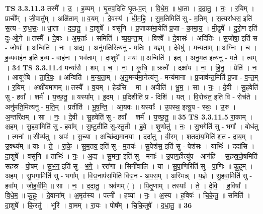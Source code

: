 \documentclass[17pt]{extarticle}
\begin{document}
                  \newline
                                \textbf{ TS 3.3.11.3} \newline
                  तस्मै᳚ । उ॒ । ह॒व्यम् । घृ॒तव॒दिति॑ घृ॒त-व॒त् । वि॒धे॒म॒ ॥ धा॒ता । द॒दा॒तु॒ । नः॒ । र॒यिम् । प्राची᳚म् । जी॒वातु᳚म् । अक्षि॑ताम् ॥ व॒यम् । दे॒वस्य॑ । धी॒म॒हि॒ । सु॒म॒तिमिति॑ सु - म॒तिम् । स॒त्यरा॑धस॒ इति॑ स॒त्य - रा॒ध॒सः॒ ॥ धा॒ता । द॒दा॒तु॒ । दा॒शुषे᳚ । वसू॑नि । प्र॒जाका॑मा॒येति॑ प्र॒जा - का॒मा॒य॒ । मी॒ढुषे᳚ । दु॒रो॒ण इति॑ दुः-ओ॒ने ॥ तस्मै᳚ । दे॒वाः । अ॒मृताः᳚ । समिति॑ । व्य॒य॒न्ता॒म् । विश्वे᳚ । दे॒वासः॑ । अदि॑तिः । स॒जोषा॒ इति॑ स - जोषाः᳚ ॥ अन्विति॑ । नः॒ । अ॒द्य । अनु॑मति॒रित्यनु॑ - म॒तिः॒ । य॒ज्ञ्म् । दे॒वेषु॑ । म॒न्य॒ता॒म् ॥ अ॒ग्निः । च॒ । ह॒व्य॒वाह॑न॒ इति॑ हव्य - वाह॑नः । भव॑ताम् । दा॒शुषे᳚ । मयः॑ ॥ अन्विति॑ । इत् । अ॒नु॒म॒त॒ इत्य॑नु - म॒ते॒ । त्वम् । \textbf{  34} \newline
                  \newline
                                \textbf{ TS 3.3.11.4} \newline
                  मन्या॑सै । शम् । च॒ । नः॒ । कृ॒धि॒ ॥ क्रत्वे᳚ । दक्षा॑य । नः॒ । हि॒नु॒ । प्रेति॑ । नः॒ । आयूꣳ॑षि । ता॒रि॒षः॒ ॥ अन्विति॑ । म॒न्य॒ता॒म् । अ॒नु॒मन्य॑मा॒नेत्य॑नु - मन्य॑माना । प्र॒जाव॑न्त॒मिति॑ प्र॒जा - व॒न्त॒म् । र॒यिम् । अक्षी॑यमाणम् ॥ तस्यै᳚ । व॒यम् । हेड॑सि । मा । अपीति॑ । भू॒म॒ । सा । नः॒ । दे॒वी । सु॒हवेति॑ सु - हवा᳚ । शर्म॑ । य॒च्छ॒तु॒ ॥ यस्या᳚म् । इ॒दम् । प्र॒दिशीति॑ प्र - दिशि॑ । यत् । वि॒रोच॑त॒ इति॑ वि - रोच॑ते । अनु॑मति॒मित्यनु॑ - म॒ति॒म् । प्रतीति॑ । भू॒ष॒न्ति॒ । आ॒यवः॑ ॥ यस्याः᳚ । उ॒पस्थ॒ इत्यु॒प - स्थः॒ । उ॒रु । अ॒न्तरि॑क्षम् । सा । नः॒ । दे॒वी । सु॒हवेति॑ सु - हवा᳚ । शर्म॑ । य॒च्छ॒तु॒ ॥ \textbf{  35} \newline
                  \newline
                                \textbf{ TS 3.3.11.5} \newline
                  रा॒काम् । अ॒हम् । सु॒हवा॒मिति॑ सु - हवा᳚म् । सु॒ष्टु॒तीति॑ सु-स्तु॒ती । हु॒वे॒ । शृ॒णोतु॑ । नः॒ । सु॒भगेति॑ सु - भगा᳚ । बोध॑तु । त्मना᳚ ॥ सीव्य॑तु । अपः॑ । सू॒च्या । अच्छि॑द्यमानया । ददा॑तु । वी॒रम् । श॒तदा॑य॒मिति॑ श॒त - दा॒य॒म् । उ॒क्थ्य᳚म् ॥ याः । ते॒ । रा॒के॒ । सु॒म॒तय॒ इति॑ सु - म॒तयः॑ । सु॒पेश॑स॒ इति॑ सु - पेश॑सः । याभिः॑ । ददा॑सि । दा॒शुषे᳚ । वसू॑नि ॥ ताभिः॑ । नः॒ । अ॒द्य । सु॒मना॒ इति॑ सु - मनाः᳚ । उ॒पाग॒हीत्यु॑प - आग॑हि । स॒ह॒स्र॒पो॒षमिति॑ सहस्र - पो॒षम् । सु॒भ॒ग॒ इति॑ सु - भ॒गे॒ । ररा॑णा ॥ सिनी॑वालि । या । सु॒पा॒णिरिति॑ सु - पा॒णिः ॥ कु॒हूम् । अ॒हम् । सु॒भगा॒मिति॑ सु - भगा᳚म् । वि॒द्म॒नाप॑स॒मिति॑ विद्म॒न - अ॒प॒स॒म् । अ॒स्मिन्न् । य॒ज्ञे । सु॒हवा॒मिति॑ सु - हवा᳚म् । जो॒ह॒वी॒मि॒ ॥ सा । नः॒ । द॒दा॒तु॒ । श्रव॑णम् ( ) । पि॒तृ॒णाम् । तस्याः᳚ । ते॒ । दे॒वि॒ । ह॒विषा᳚ । वि॒धे॒म॒ ॥ कु॒हूः । दे॒वाना᳚म् । अ॒मृत॑स्य । पत्नी᳚ । हव्या᳚ । नः॒ । अ॒स्य । ह॒विषः॑ । चि॒के॒तु॒ ॥ समिति॑ । दा॒शुषे᳚ । कि॒रतु॑ । भूरि॑ । वा॒मम् । रा॒यः । पोष᳚म् । चि॒कि॒तुषे᳚ । द॒धा॒तु॒ ॥ \textbf{  36} \newline
\end{document}

